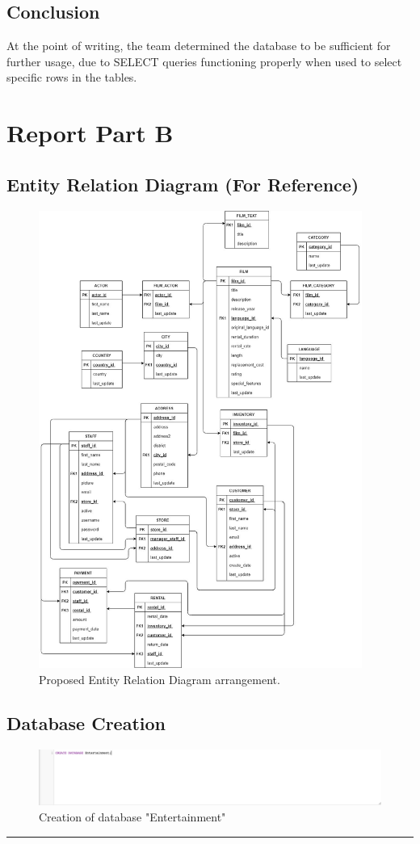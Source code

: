\documentclass[openany]{article}
\begin{document}
\subsection{Conclusion}
	At the point of writing, the team determined the database to be sufficient for further usage, due to SELECT queries functioning properly when used to select specific rows in the tables.

\newpage

\section{Report Part B}
\subsection*{Entity Relation Diagram (For Reference)}
	\begin{figure}[H]
		\includegraphics[width=\textwidth,height=15cm]{er_diagram}
		\caption{Proposed Entity Relation Diagram arrangement. \protect\footnotemark}	
	\end{figure}


\subsection{Database Creation}
	\begin{figure}[H]
		\includegraphics[width=\textwidth]{database_create}
		\caption{Creation of database "Entertainment"}	
	\end{figure}
	\rule{\textwidth}{0.4pt}
\end{document}
